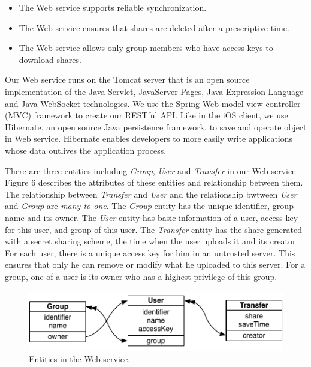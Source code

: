 \documentclass[twocolumn,10pt]{article}
\begin{document}
\begin{itemize}
\setlength{\itemsep}{1pt}
\setlength{\parskip}{0pt}
\setlength{\parsep}{0pt}
	\item The Web service supports reliable synchronization.
    \item The Web service ensures that shares are deleted after a prescriptive time.
    \item The Web service allows only group members who have access keys to download shares.
\end{itemize}

Our Web service runs on the Tomcat server that is an open source implementation of the Java Servlet, JavaServer Pages, Java Expression Language and Java WebSocket technologies. We use the Spring Web model-view-controller (MVC) framework to create our RESTful API. Like in the iOS client, we use Hibernate, an open source Java persistence framework, to save and operate object in Web service. Hibernate enables developers to more easily write applications whose data outlives the application process.

There are three entities including \emph{Group}, \emph{User} and \emph{Transfer} in our Web service. Figure 6 describes the attributes of these entities and relationship between them. The relationship between \emph{Transfer} and \emph{User} and the relationship bwtween \emph{User} and \emph{Group} are \emph{many-to-one}. The \emph{Group} entity has the unique identifier, group name and its owner. The \emph{User} entity has basic information of a user, access key for this user, and group of this user. The \emph{Transfer} entity has the share generated with a secret sharing scheme, the time when the user uploads it and its creator. For each user, there is a unique access key for him in an untrusted server. This ensures that only he can remove or modify what he uploaded to this server. For a group, one of a user is its owner who has a highest privilege of this group.

\begin{figure}[t]
	\centering
	\includegraphics[scale=0.5]{entites}
	\caption{Entities in the Web service.}
\end{figure}
\end{document}
